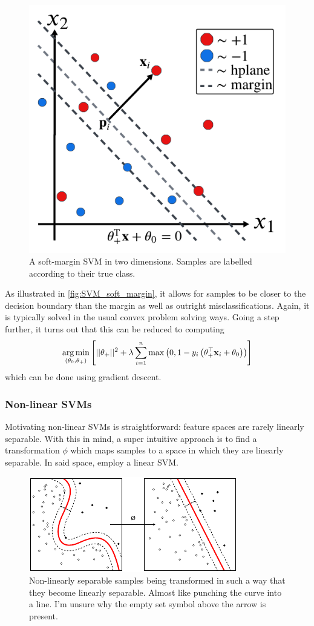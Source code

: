 \documentclass[11pt]{article}
\begin{document}
\begin{figure}[t]
    \centering
    \includegraphics[width=0.75\columnwidth]{./figures/supervised_learning/SVM_soft_margin.pdf}
    \caption{A soft-margin SVM in two dimensions. Samples are labelled according to their true class.}
    \label{fig:SVM_soft_margin}
\end{figure}

\noindent As illustrated in \autoref{fig:SVM_soft_margin}, it allows for samples to be closer to the decision boundary than the margin as well as outright misclassifications. Again, it is typically solved in the usual convex problem solving ways. Going a step further, it turns out that this can be reduced to computing
$$
\operatorname*{arg\,min}_{(\theta_0,\theta_+)}\left[||\theta_+||^2+\lambda\sum_{i=1}^n\max\left(0,1-y_i\left(\theta_+^\top \mathbf{x}_i+\theta_0\right)\right)\right]
$$
which can be done using gradient descent.

\subsubsection{Non-linear SVMs}
Motivating non-linear SVMs is straightforward: feature spaces are rarely linearly separable. With this in mind, a super intuitive approach is to find a transformation $\phi$ which maps samples to a space in which they are linearly separable. In said space, employ a linear SVM. 

\begin{figure}[t]
    \centering
    \includegraphics[width=0.75\columnwidth]{./figures/supervised_learning/SVM_non_linear.pdf}
    \caption{Non-linearly separable samples being transformed in such a way that they become linearly separable. Almost like punching the curve into a line. I'm unsure why the empty set symbol above the arrow is present. }
    \label{fig:SVM_non_linear}
\end{figure}
\end{document}
